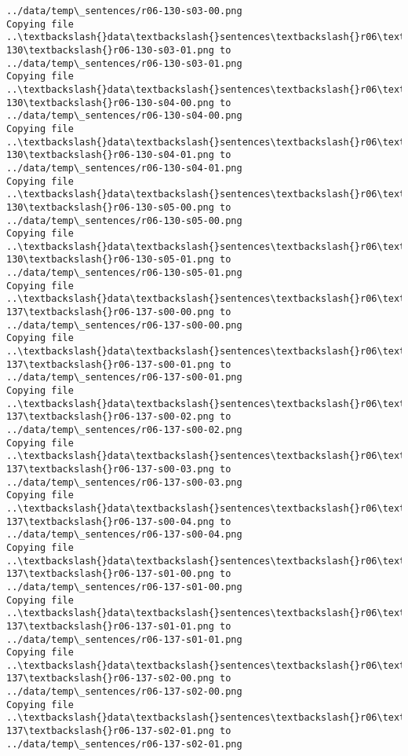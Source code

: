 \documentclass[11pt]{article}
\begin{document}
\begin{Verbatim}[commandchars=\\\{\}]
../data/temp\_sentences/r06-130-s03-00.png
Copying file ..\textbackslash{}data\textbackslash{}sentences\textbackslash{}r06\textbackslash{}r06-130\textbackslash{}r06-130-s03-01.png to
../data/temp\_sentences/r06-130-s03-01.png
Copying file ..\textbackslash{}data\textbackslash{}sentences\textbackslash{}r06\textbackslash{}r06-130\textbackslash{}r06-130-s04-00.png to
../data/temp\_sentences/r06-130-s04-00.png
Copying file ..\textbackslash{}data\textbackslash{}sentences\textbackslash{}r06\textbackslash{}r06-130\textbackslash{}r06-130-s04-01.png to
../data/temp\_sentences/r06-130-s04-01.png
Copying file ..\textbackslash{}data\textbackslash{}sentences\textbackslash{}r06\textbackslash{}r06-130\textbackslash{}r06-130-s05-00.png to
../data/temp\_sentences/r06-130-s05-00.png
Copying file ..\textbackslash{}data\textbackslash{}sentences\textbackslash{}r06\textbackslash{}r06-130\textbackslash{}r06-130-s05-01.png to
../data/temp\_sentences/r06-130-s05-01.png
Copying file ..\textbackslash{}data\textbackslash{}sentences\textbackslash{}r06\textbackslash{}r06-137\textbackslash{}r06-137-s00-00.png to
../data/temp\_sentences/r06-137-s00-00.png
Copying file ..\textbackslash{}data\textbackslash{}sentences\textbackslash{}r06\textbackslash{}r06-137\textbackslash{}r06-137-s00-01.png to
../data/temp\_sentences/r06-137-s00-01.png
Copying file ..\textbackslash{}data\textbackslash{}sentences\textbackslash{}r06\textbackslash{}r06-137\textbackslash{}r06-137-s00-02.png to
../data/temp\_sentences/r06-137-s00-02.png
Copying file ..\textbackslash{}data\textbackslash{}sentences\textbackslash{}r06\textbackslash{}r06-137\textbackslash{}r06-137-s00-03.png to
../data/temp\_sentences/r06-137-s00-03.png
Copying file ..\textbackslash{}data\textbackslash{}sentences\textbackslash{}r06\textbackslash{}r06-137\textbackslash{}r06-137-s00-04.png to
../data/temp\_sentences/r06-137-s00-04.png
Copying file ..\textbackslash{}data\textbackslash{}sentences\textbackslash{}r06\textbackslash{}r06-137\textbackslash{}r06-137-s01-00.png to
../data/temp\_sentences/r06-137-s01-00.png
Copying file ..\textbackslash{}data\textbackslash{}sentences\textbackslash{}r06\textbackslash{}r06-137\textbackslash{}r06-137-s01-01.png to
../data/temp\_sentences/r06-137-s01-01.png
Copying file ..\textbackslash{}data\textbackslash{}sentences\textbackslash{}r06\textbackslash{}r06-137\textbackslash{}r06-137-s02-00.png to
../data/temp\_sentences/r06-137-s02-00.png
Copying file ..\textbackslash{}data\textbackslash{}sentences\textbackslash{}r06\textbackslash{}r06-137\textbackslash{}r06-137-s02-01.png to
../data/temp\_sentences/r06-137-s02-01.png

\end{Verbatim}
\end{document}
